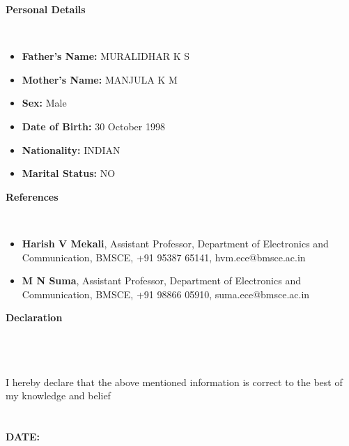 \documentclass[a4paper,10pt]{article}
\newcommand{\lsep}{-0.5cm}
\newcommand{\resheading}[1]{{\small \colorbox{mygrey}{\begin{minipage}{0.975\textwidth}{\textbf{#1 \vphantom{p\^{E}}}}\end{minipage}}}}
\begin{document}
\resheading{\textbf{Personal Details} }\\[\lsep]
\begin{itemize}
\item \noindent \textbf{Father's Name:} MURALIDHAR K S
\item \noindent \textbf{Mother's Name:} MANJULA K M
\item \noindent \textbf{Sex:} Male
\item \noindent \textbf{Date of Birth:} 30 October 1998
\item \noindent \textbf{Nationality:} INDIAN
\item \noindent \textbf{Marital Status:} NO
\end{itemize}


\resheading{\textbf{References} }\\[\lsep]
\begin{itemize}
\item\noindent\textbf{Harish V Mekali}, Assistant Professor, Department of Electronics and Communication, BMSCE, +91 95387 65141, hvm.ece@bmsce.ac.in
\item\noindent\textbf{M N Suma}, Assistant Professor, Department of Electronics and Communication, BMSCE, +91 98866 05910, suma.ece@bmsce.ac.in
\end{itemize}

\resheading{\textbf{Declaration} }\\[\lsep]\\\\
\indent I hereby declare that the above mentioned information is correct to the best of my knowledge and belief\\\\\\
\indent\textbf{DATE:} \@date
\end{document}
